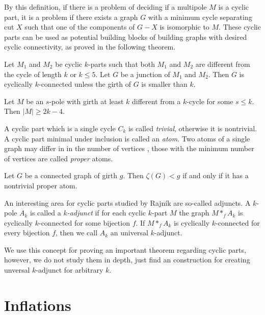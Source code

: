 \documentclass[12pt, twoside]{book}
\begin{document}
By this definition, if there is a problem of deciding if a multipole $M$ is a cyclic part, it is a problem if there exists a graph $G$ with a minimum cycle separating cut $X$ such that one of the components of $G-X$ is isomorphic to $M$. These cyclic parts can be used as potential building blocks of building graphs with desired cyclic connectivity, as proved in the following theorem.

\begin{theorem}
	Let $M_1$ and $M_2$ be cyclic $k$-parts such that both $M_1$ and $M_2$ are diﬀerent from the cycle of length $k$ or $k\leq 5$. Let $G$ be a junction of $M_1$ and $M_2$. Then $G$ is cyclically $k$-connected unless the girth of $G$ is smaller than $k$.
\end{theorem}

\begin{lemma}\label{lem:rajnik5.1}
	Let $M$ be an $s$-pole with girth at least $k$ different from a $k$-cycle for some $s\leq k$. Then $|M| \geq 2k - 4$.
\end{lemma}

A cyclic part which is a single cycle $C_k$ is called \textit{trivial}, otherwise it is nontrivial. A cyclic part minimal under inclusion is called an \textit{atom}. Two atoms of a single graph may differ in in the number of vertices \cite{atoms-of-cyclic}, those with the minimum number of vertices are called \textit{proper} atoms.

\begin{proposition}
	Let $G$ be a connected graph of girth $g$. Then $\zeta(G)<g$ if and only if it has a nontrivial proper atom.
\end{proposition}

An interesting area for cyclic parts studied by Rajník \cite{Rajnik_phd} are so-called adjuncts. A $k$-pole $A_k$ is called a \textit{$k$-adjunct} if for each cyclic $k$-part $M$ the graph $M*_f A_k$ is cyclically $k$-connected for some bijection $f$. If $M*_f A_k$ is cyclically $k$-connected for every bijection $f$, then we call $A_k$ an universal $k$-adjunct.

We use this concept for proving an important theorem regarding cyclic parts, however, we do not study them in depth, just find an construction for creating unversal $k$-adjunct for arbitrary $k$. 

\section{Inflations}\label{sec:inflations}
\end{document}
